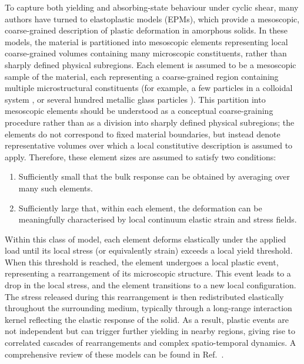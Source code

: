 \documentclass[asymmetricmargins]{library/duthesis}%
\begin{document}
To capture both yielding and absorbing-state behaviour under cyclic shear, many authors have turned to elastoplastic models (EPMs), which provide a mesoscopic, coarse-grained description of plastic deformation in amorphous solids. In these models, the material is partitioned into mesoscopic elements representing local coarse-grained volumes containing many microscopic constituents, rather than sharply defined physical subregions. Each element is assumed to be a mesoscopic sample of the material, each representing a coarse-grained region containing multiple microstructural constituents (for example, a few particles in a colloidal system \cite{Schall2007}, or several hundred metallic glass particles \cite{Pan2008}). This partition into mesoscopic elements should be understood as a conceptual coarse-graining procedure rather than as a division into sharply defined physical subregions; the elements do not correspond to fixed material boundaries, but instead denote representative volumes over which a local constitutive description is assumed to apply. Therefore, these element sizes are assumed to satisfy two conditions:
\begin{enumerate}
    \item Sufficiently small that the bulk response can be obtained by averaging over many such elements.
    \item Sufficiently large that, within each element, the deformation can be meaningfully characterised by local continuum elastic strain and stress fields.
\end{enumerate}

Within this class of model, each element deforms elastically under the applied load until its local stress (or equivalently strain) exceeds a local yield threshold. When this threshold is reached, the element undergoes a local plastic event, representing a rearrangement of its microscopic structure. This event leads to a drop in the local stress, and the element transitions to a new local configuration. The stress released during this rearrangement is then redistributed elastically throughout the surrounding medium, typically through a long-range interaction kernel reflecting the elastic response of the solid. As a result, plastic events are not independent but can trigger further yielding in nearby regions, giving rise to correlated cascades of rearrangements and complex spatio-temporal dynamics. A comprehensive review of these models can be found in Ref.~\cite{nicolas_deformation_2018}. 
\end{document}
